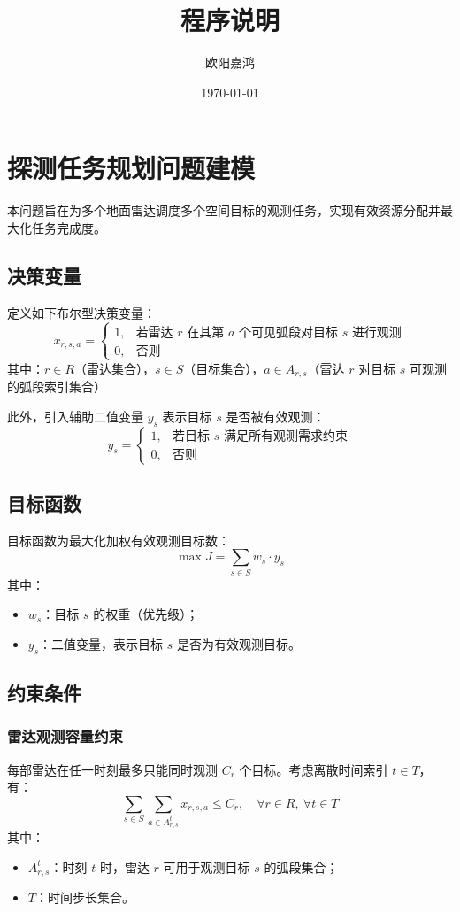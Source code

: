 \documentclass[openany,zihao=-4,UTF8]{ctexart}
\title{程序说明}
\author{欧阳嘉鸿}
\date{\today}
\begin{document}
\maketitle
\newpage
\tableofcontents
\newpage
\section{探测任务规划问题建模}
本问题旨在为多个地面雷达调度多个空间目标的观测任务，实现有效资源分配并最大化任务完成度。

\subsection{决策变量}
定义如下布尔型决策变量：
$$
    x_{r,s,a} =
    \begin{cases}
        1, & \text{若雷达 } r \text{ 在其第 } a \text{ 个可见弧段对目标 } s \text{ 进行观测} \\
        0, & \text{否则}
    \end{cases}
$$
其中：$r \in R$（雷达集合），$s \in S$（目标集合），$a \in A_{r,s}$（雷达 $r$ 对目标 $s$ 可观测的弧段索引集合）

此外，引入辅助二值变量 $y_s$ 表示目标 $s$ 是否被有效观测：
$$
    y_s =
    \begin{cases}
        1, & \text{若目标 } s \text{ 满足所有观测需求约束} \\
        0, & \text{否则}
    \end{cases}
$$

\subsection{目标函数}
目标函数为最大化加权有效观测目标数：
$$
    \max J = \sum_{s \in S} w_s \cdot y_s
$$
其中：
\begin{itemize}
    \item $w_s$：目标 $s$ 的权重（优先级）；
    \item $y_s$：二值变量，表示目标 $s$ 是否为有效观测目标。
\end{itemize}

\subsection{约束条件}
\subsubsection{雷达观测容量约束}
每部雷达在任一时刻最多只能同时观测 $C_r$ 个目标。考虑离散时间索引 $t \in T$，有：
$$
    \sum_{s \in S} \sum_{a \in A_{r,s}^t} x_{r,s,a} \leq C_r, \quad \forall r \in R,\ \forall t \in T
$$
其中：
\begin{itemize}
    \item $A_{r,s}^t$：时刻 $t$ 时，雷达 $r$ 可用于观测目标 $s$ 的弧段集合；
    \item $T$：时间步长集合。
\end{itemize}
\end{document}
